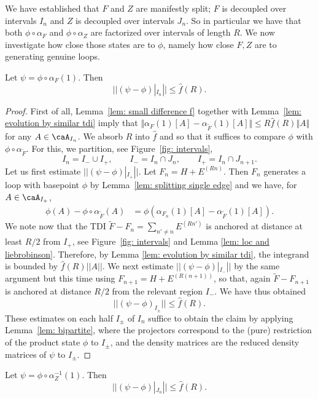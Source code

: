 We have established that $F$ and $Z$  are manifestly split;  $F$ is decoupled over intervals $I_n$ and $Z$ is decoupled over intervals $J_n$. 
So in particular we have that both $\phi \circ \alpha_{F}$ and $\phi \circ \alpha_{Z}$ are factorized over intervals of length $R$.  
We now investigate how close those states are to $\phi$, namely how close $F, Z$ are to generating genuine loops.  
%
%
%
\begin{lemma}\label{lem: almost loop f}
	Let $\psi=\phi \circ \alpha_{F}(1)$. Then
	$$||(\psi  - \phi)|_{{I_n}}|| \leq \hat{f}(R).$$
\end{lemma}
\begin{proof}
	First of all, Lemma~\ref{lem: small difference f} together with Lemma~\ref{lem: evolution by similar tdi} imply that $\Vert \alpha_{F}(1)[A]- \alpha_{\widetilde F}(1)[A]\Vert \leq  R \hat f(R)\Vert A\Vert$ for any $A\in\caA_{I_n}$. We absorb $R$ into $\hat f$ and so that it suffices to compare $\phi$ with $\phi\circ\alpha_{\widetilde F}$. For this, we  partition, see Figure~\ref{fig: intervals},  
	$$I_n= I_- \cup I_+, \qquad  I_-=I_n \cap J_{n}, \qquad I_+=I_n \cap J_{n+1}.$$
	Let us first estimate $||(\psi-\phi)|_{I_{+}}||$.
	Let $F_n=H+E^{(Rn)}$. Then $F_n$ generates a loop with basepoint $\phi$ by Lemma~\ref{lem: splitting single edge} and we have, for $A\in \caA_{I_+}$,
	\begin{align}
		\phi(A)-\phi\circ\alpha_{\widetilde F}(A)& = \phi(\alpha_{F_n}(1)[A]- \alpha_{\widetilde F}(1)[A] ).
	\end{align}
	We note now that the TDI $\widetilde F-F_n=\sum_{n'\neq n } E^{(Rn')}$ is anchored at distance at least $R/2$ from $I_+$, see Figure~\ref{fig: intervals} and Lemma \ref{lem: loc and liebrobinson}.  Therefore, by Lemma \ref{lem: evolution by similar tdi},  the integrand is bounded by  $\hat{f}(R) ||A ||$.
	We next estimate $||(\psi-\phi)|_{I_{-}}||$ by the same argument but this time using $F_{n+1}=H+E^{(R(n+1))}$, so that, again $\widetilde F-F_{n+1}$ is anchored at distance $R/2$ from the relevant region $I_-$.  We have thus obtained 
	$$
	||(\psi-\phi)_{I_{\pm}}||  \leq \hat{f}(R).
	$$
	These estimates on each half $I_\pm$ of $I_n$ suffice to obtain the claim by applying Lemma~\ref{lem: bipartite}, where the projectors correspond to the (pure) restriction of the product state $\phi$ to $I_\pm$, and the density matrices are the reduced density matrices of $\psi$ to $I_\pm$.
\end{proof}
%
%
%
\begin{lemma}\label{lem: almost loop k}
	Let $\psi=\phi \circ \alpha_{Z}^{-1}(1)$. Then
	$$||(\psi  -\phi)|_{J_n}|| \leq \hat{f}(R).$$
\end{lemma}
